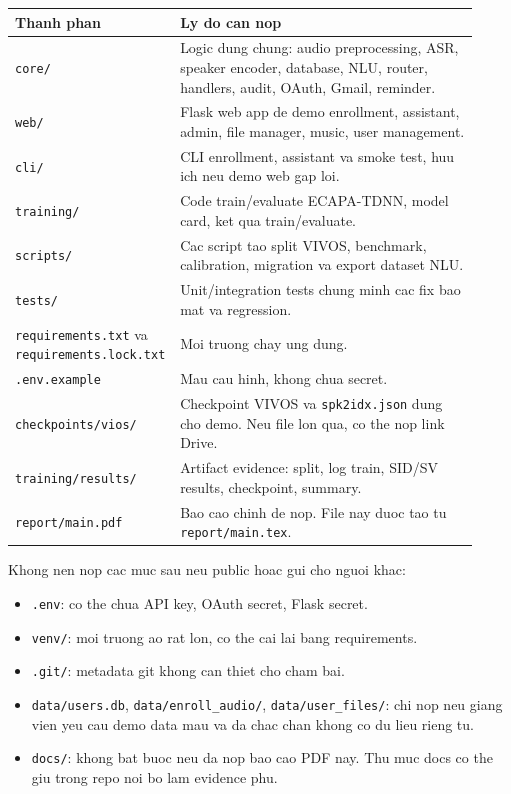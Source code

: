 \documentclass[12pt,a4paper]{article}
\begin{document}
\begin{longtable}{p{0.28\linewidth}p{0.64\linewidth}}
\toprule
\textbf{Thanh phan} & \textbf{Ly do can nop} \\
\midrule
\endhead
\texttt{core/} & Logic dung chung: audio preprocessing, ASR, speaker encoder, database, NLU, router, handlers, audit, OAuth, Gmail, reminder. \\
\texttt{web/} & Flask web app de demo enrollment, assistant, admin, file manager, music, user management. \\
\texttt{cli/} & CLI enrollment, assistant va smoke test, huu ich neu demo web gap loi. \\
\texttt{training/} & Code train/evaluate ECAPA-TDNN, model card, ket qua train/evaluate. \\
\texttt{scripts/} & Cac script tao split VIVOS, benchmark, calibration, migration va export dataset NLU. \\
\texttt{tests/} & Unit/integration tests chung minh cac fix bao mat va regression. \\
\texttt{requirements.txt} va \texttt{requirements.lock.txt} & Moi truong chay ung dung. \\
\texttt{.env.example} & Mau cau hinh, khong chua secret. \\
\texttt{checkpoints/vios/} & Checkpoint VIVOS va \texttt{spk2idx.json} dung cho demo. Neu file lon qua, co the nop link Drive. \\
\texttt{training/results/} & Artifact evidence: split, log train, SID/SV results, checkpoint, summary. \\
\texttt{report/main.pdf} & Bao cao chinh de nop. File nay duoc tao tu \texttt{report/main.tex}. \\
\bottomrule
\end{longtable}

Khong nen nop cac muc sau neu public hoac gui cho nguoi khac:

\begin{itemize}
  \item \texttt{.env}: co the chua API key, OAuth secret, Flask secret.
  \item \texttt{venv/}: moi truong ao rat lon, co the cai lai bang requirements.
  \item \texttt{.git/}: metadata git khong can thiet cho cham bai.
  \item \texttt{data/users.db}, \texttt{data/enroll\_audio/}, \texttt{data/user\_files/}: chi nop neu giang vien yeu cau demo data mau va da chac chan khong co du lieu rieng tu.
  \item \texttt{docs/}: khong bat buoc neu da nop bao cao PDF nay. Thu muc docs co the giu trong repo noi bo lam evidence phu.
\end{itemize}
\end{document}

